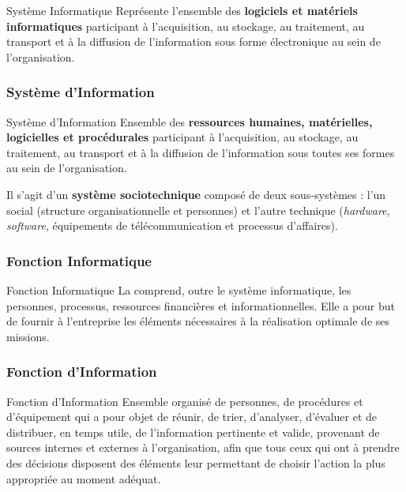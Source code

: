 \begin{boxdef}{Système Informatique}
Représente l'ensemble des \textbf{logiciels et matériels informatiques} participant à
l'acquisition, au stockage, au traitement, au transport et à la diffusion de
l'information sous forme électronique au sein de l'organisation.
\end{boxdef}

\subsubsection{Système d'Information}

\begin{boxdef}{Système d'Information}
Ensemble des \textbf{ressources humaines, matérielles, logicielles et procédurales}
participant à l'acquisition, au stockage, au traitement, au transport et à la diffusion
de l'information sous toutes ses formes au sein de l'organisation.

Il s'agit d'un \textbf{système sociotechnique} composé de deux sous-systèmes :
l'un social (structure organisationnelle et personnes) et l'autre technique
(\textit{hardware}, \textit{software}, équipements de télécommunication et processus
d'affaires).
\end{boxdef}

\subsubsection{Fonction Informatique}

\begin{boxdef}{Fonction Informatique}
La  comprend, outre le système informatique, les
personnes, processus, ressources financières et informationnelles. Elle a pour but de
fournir à l'entreprise les éléments nécessaires à la réalisation optimale de ses
missions.
\end{boxdef}

\subsubsection{Fonction d'Information}

\begin{boxdef}{Fonction d'Information}
Ensemble organisé de personnes, de procédures et d'équipement qui a pour objet de
réunir, de trier, d'analyser, d'évaluer et de distribuer, en temps utile, de l'information
pertinente et valide, provenant de sources internes et externes à l'organisation, afin
que tous ceux qui ont à prendre des décisions disposent des éléments leur permettant
de choisir l'action la plus appropriée au moment adéquat.
\end{boxdef}

